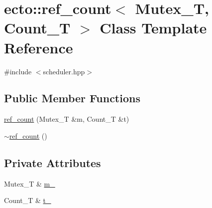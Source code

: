 \hypertarget{classecto_1_1ref__count}{\section{ecto\-:\-:ref\-\_\-count$<$ Mutex\-\_\-\-T, Count\-\_\-\-T $>$ Class Template Reference}
\label{classecto_1_1ref__count}
}


{\ttfamily \#include $<$scheduler.\-hpp$>$}

\subsection*{Public Member Functions}
\begin{DoxyCompactItemize}
\item 
\hyperlink{classecto_1_1ref__count_a39fc7e105b142b7444a90dc6a3796828}{ref\-\_\-count} (Mutex\-\_\-\-T \&m, Count\-\_\-\-T \&t)
\item 
\hyperlink{classecto_1_1ref__count_a22b67e2d381344ff4c9b4c453bb47e23}{$\sim$ref\-\_\-count} ()
\end{DoxyCompactItemize}
\subsection*{Private Attributes}
\begin{DoxyCompactItemize}
\item 
Mutex\-\_\-\-T \& \hyperlink{classecto_1_1ref__count_a766db0f4309f593f6c3086a1ebead3a5}{m\-\_\-}
\item 
Count\-\_\-\-T \& \hyperlink{classecto_1_1ref__count_a689842816509f8f13710aee79b8c9898}{t\-\_\-}
\end{DoxyCompactItemize}


